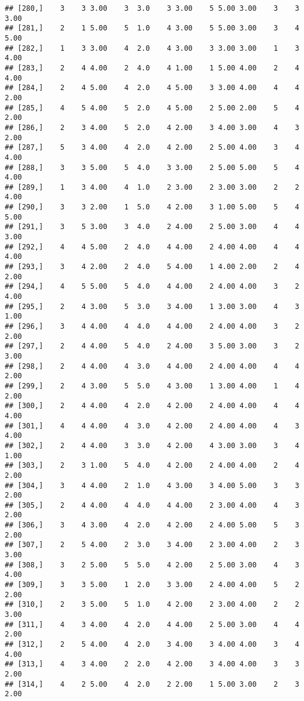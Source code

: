 \documentclass[]{article}
\begin{document}
\begin{verbatim}
## [280,]    3    3 3.00    3  3.0    3 3.00    5 5.00 3.00    3    3 3.00
## [281,]    2    1 5.00    5  1.0    4 3.00    5 5.00 3.00    3    4 5.00
## [282,]    1    3 3.00    4  2.0    4 3.00    3 3.00 3.00    1    3 4.00
## [283,]    2    4 4.00    2  4.0    4 1.00    1 5.00 4.00    2    4 4.00
## [284,]    2    4 5.00    4  2.0    4 5.00    3 3.00 4.00    4    4 2.00
## [285,]    4    5 4.00    5  2.0    4 5.00    2 5.00 2.00    5    4 2.00
## [286,]    2    3 4.00    5  2.0    4 2.00    3 4.00 3.00    4    3 2.00
## [287,]    5    3 4.00    4  2.0    4 2.00    2 5.00 4.00    3    4 4.00
## [288,]    3    3 5.00    5  4.0    3 3.00    2 5.00 5.00    5    4 4.00
## [289,]    1    3 4.00    4  1.0    2 3.00    2 3.00 3.00    2    2 4.00
## [290,]    3    3 2.00    1  5.0    4 2.00    3 1.00 5.00    5    4 5.00
## [291,]    3    5 3.00    3  4.0    2 4.00    2 5.00 3.00    4    4 3.00
## [292,]    4    4 5.00    2  4.0    4 4.00    2 4.00 4.00    4    4 4.00
## [293,]    3    4 2.00    2  4.0    5 4.00    1 4.00 2.00    2    4 2.00
## [294,]    4    5 5.00    5  4.0    4 4.00    2 4.00 4.00    3    2 4.00
## [295,]    2    4 3.00    5  3.0    3 4.00    1 3.00 3.00    4    3 1.00
## [296,]    3    4 4.00    4  4.0    4 4.00    2 4.00 4.00    3    2 2.00
## [297,]    2    4 4.00    5  4.0    2 4.00    3 5.00 3.00    3    2 3.00
## [298,]    2    4 4.00    4  3.0    4 4.00    2 4.00 4.00    4    4 2.00
## [299,]    2    4 3.00    5  5.0    4 3.00    1 3.00 4.00    1    4 2.00
## [300,]    2    4 4.00    4  2.0    4 2.00    2 4.00 4.00    4    4 4.00
## [301,]    4    4 4.00    4  3.0    4 2.00    2 4.00 4.00    4    3 4.00
## [302,]    2    4 4.00    3  3.0    4 2.00    4 3.00 3.00    3    4 1.00
## [303,]    2    3 1.00    5  4.0    4 2.00    2 4.00 4.00    2    4 2.00
## [304,]    3    4 4.00    2  1.0    4 3.00    3 4.00 5.00    3    3 2.00
## [305,]    2    4 4.00    4  4.0    4 4.00    2 3.00 4.00    4    3 2.00
## [306,]    3    4 3.00    4  2.0    4 2.00    2 4.00 5.00    5    3 2.00
## [307,]    2    5 4.00    2  3.0    3 4.00    2 3.00 4.00    2    3 3.00
## [308,]    3    2 5.00    5  5.0    4 2.00    2 5.00 3.00    4    3 4.00
## [309,]    3    3 5.00    1  2.0    3 3.00    2 4.00 4.00    5    2 2.00
## [310,]    2    3 5.00    5  1.0    4 2.00    2 3.00 4.00    2    2 3.00
## [311,]    4    3 4.00    4  2.0    4 4.00    2 5.00 3.00    4    4 2.00
## [312,]    2    5 4.00    4  2.0    3 4.00    3 4.00 4.00    3    4 4.00
## [313,]    4    3 4.00    2  2.0    4 2.00    3 4.00 4.00    3    3 2.00
## [314,]    4    2 5.00    4  2.0    2 2.00    1 5.00 3.00    2    3 2.00

\end{verbatim}
\end{document}
